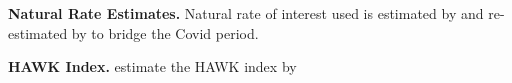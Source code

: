 \documentclass[12pt]{article}
\numberwithin{equation}{section}
\begin{document}
\noindent\textbf{Natural Rate Estimates.}
Natural rate of interest used is estimated by \citet{LW2003} and re-estimated by \citet{HLW2023} to bridge the Covid period.

\noindent\textbf{HAWK Index.} \citet{Istrefi2019} estimate the HAWK index by 







\end{document}
